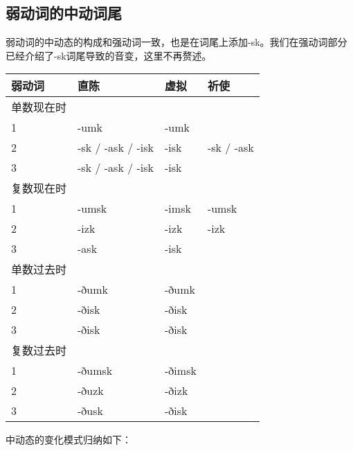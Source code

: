 \subsection{弱动词的中动词尾}\label{弱动词的中动词尾}

弱动词的中动态的构成和强动词一致，也是在词尾上添加-sk。我们在强动词部分已经介绍了-sk词尾导致的音变，这里不再赘述。

\begin{longtable}{llll}
    \toprule
    弱动词     & 直陈              & 虚拟   & 祈使       \\
    \midrule
    \endhead
    \bottomrule
    \endfoot
    单数现在时 &                   &        &            \\
    1          & -umk              & -umk   &            \\
    2          & -sk / -ask / -isk & -isk   & -sk / -ask \\
    3          & -sk / -ask / -isk & -isk   &            \\
    复数现在时 &                   &        &            \\
    1          & -umsk             & -imsk  & -umsk      \\
    2          & -izk              & -izk   & -izk       \\
    3          & -ask              & -isk   &            \\
    单数过去时 &                   &        &            \\
    1          & -ðumk             & -ðumk  &            \\
    2          & -ðisk             & -ðisk  &            \\
    3          & -ðisk             & -ðisk  &            \\
    复数过去时 &                   &        &            \\
    1          & -ðumsk            & -ðimsk &            \\
    2          & -ðuzk             & -ðizk  &            \\
    3          & -ðusk             & -ðisk  &            \\
\end{longtable}

中动态的变化模式归纳如下：

